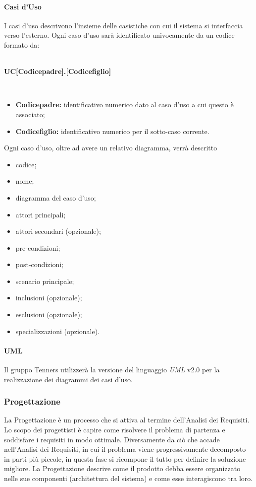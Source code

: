 \paragraph{Casi d'Uso}
I casi d'uso descrivono l'insieme delle casistiche con cui il sistema si interfaccia verso l'esterno. Ogni caso d'uso sarà identificato univocamente da un codice formato da:
\\\\
\centerline{\textbf{UC[Codicepadre].[Codicefiglio]}}\\

\begin{itemize}
	\item \textbf{Codicepadre:} identificativo numerico dato al caso d'uso a cui questo è associato;
	\item \textbf{Codicefiglio:} identificativo numerico per il sotto-caso corrente.
\end{itemize}
Ogni caso d'uso, oltre ad avere un relativo diagramma, verrà descritto 
\begin{itemize}
  \item codice;
  \item nome;
  \item diagramma del caso d'uso;
  \item attori principali;
  \item attori secondari (opzionale);
  \item pre-condizioni;
  \item post-condizioni;
  \item scenario principale;
  \item inclusioni (opzionale);
  \item esclusioni (opzionale);
  \item specializzazioni (opzionale).
\end{itemize}

\paragraph{UML\glo}
Il gruppo Tenners utilizzerà la versione del linguaggio \textit{UML\glo} v2.0 per la realizzazione dei diagrammi dei casi d'uso.
\subsubsection{Progettazione}
La Progettazione è un processo che si attiva al termine dell'Analisi dei Requisiti. Lo scopo dei progettisti è capire come risolvere il problema di partenza e soddisfare i requisiti in modo ottimale. Diversamente da ciò che accade nell'Analisi dei Requisiti, in cui il problema viene progressivamente decomposto in parti più piccole, in questa fase si ricompone il tutto per definire la soluzione migliore. La Progettazione descrive come il prodotto debba essere organizzato nelle sue componenti (architettura del sistema) e come esse interagiscono tra loro.
